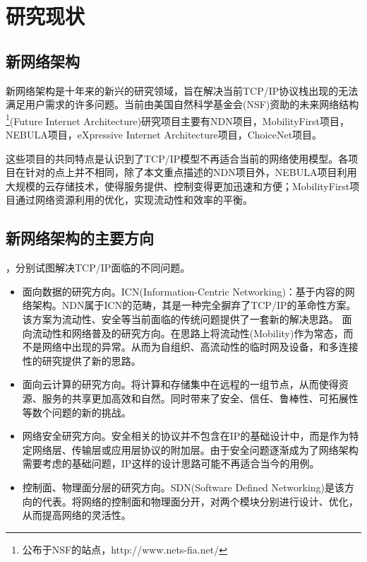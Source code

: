\section{研究现状}

\subsection*{新网络架构}
\par
新网络架构是十年来的新兴的研究领域，旨在解决当前TCP/IP协议栈出现的无法满足用户需求的许多问题。当前由美国自然科学基金会(NSF)资助的未来网络结构\footnote{公布于NSF的站点，http://www.nets-fia.net/}(Future Internet Architecture)研究项目主要有NDN项目，MobilityFirst项目，NEBULA项目，eXpressive Internet Architecture项目，ChoiceNet项目。
\par
这些项目的共同特点是认识到了TCP/IP模型不再适合当前的网络使用模型。各项目在针对的点上并不相同，除了本文重点描述的NDN项目外，NEBULA项目利用大规模的云存储技术，使得服务提供、控制变得更加迅速和方便；MobilityFirst项目通过网络资源利用的优化，实现流动性和效率的平衡。
\subsection*{新网络架构的主要方向}
，分别试图解决TCP/IP面临的不同问题。

\begin{itemize}
\item
面向数据的研究方向。ICN(Information-Centric Networking)：基于内容的网络架构。NDN属于ICN的范畴，其是一种完全摒弃了TCP/IP的革命性方案。该方案为流动性、安全等当前面临的传统问题提供了一套新的解决思路。
面向流动性和网络普及的研究方向。在思路上将流动性(Mobility)作为常态，而不是网络中出现的异常。从而为自组织、高流动性的临时网及设备，和多连接性的研究提供了新的思路。
\item
面向云计算的研究方向。将计算和存储集中在远程的一组节点，从而使得资源、服务的共享更加高效和自然。同时带来了安全、信任、鲁棒性、可拓展性等数个问题的新的挑战。
\item
网络安全研究方向。安全相关的协议并不包含在IP的基础设计中，而是作为特定网络层、传输层或应用层协议的附加层。由于安全问题逐渐成为了网络架构需要考虑的基础问题，IP这样的设计思路可能不再适合当今的用例。
\item
控制面、物理面分层的研究方向。SDN(Software Defined Networking)是该方向的代表。将网络的控制面和物理面分开，对两个模块分别进行设计、优化，从而提高网络的灵活性。
\end{itemize}

